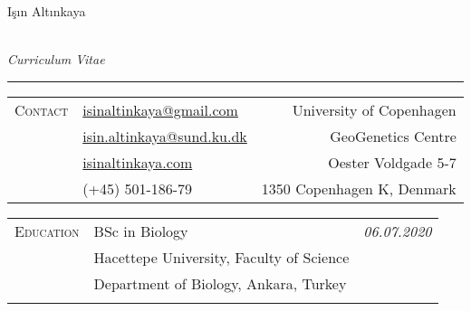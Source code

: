 \documentclass[letterpaper,11pt]{article}
\begin{document}
\begin{flushright}
\begin{Huge}I\c{s}{\i}n Alt{\i}nkaya\end{Huge} \\
 \textsl{\large Curriculum Vitae}
\vspace{1ex} 
\hrule 
\vspace{2ex}
\end{flushright}

\noindent \begin{tabularx}{\textwidth}{@{} l l r}
\textsc{Contact \space}
& \href{mailto:isinaltinkaya@gmail.com}{isinaltinkaya@gmail.com}
& University of Copenhagen \\
& \href{mailto:isin.altinkaya@sund.ku.dk}{isin.altinkaya@sund.ku.dk}
& GeoGenetics Centre  \\
& \href{http://isinaltinkaya.com/}{isinaltinkaya.com}
& Oester Voldgade 5-7  \\
& (+45) 501-186-79 
& 1350 Copenhagen K, Denmark   \\
\end{tabularx}

\medskip

\noindent \begin{tabular}{@{} l l r}
 \textsc{Education}
 & BSc in Biology
 & \textit{06.07.2020} \\
     & Hacettepe University, Faculty of Science \\
     & Department of Biology, Ankara, Turkey \\
     & \\
\end{tabular}
\end{document}
